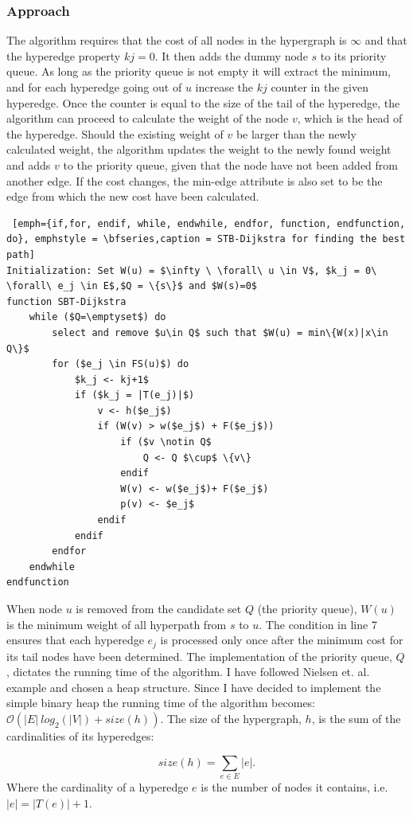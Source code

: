 \documentclass[a4paper,10pt,titlepage]{paper}
\begin{document}
\subsubsection{Approach}
The algorithm requires that the cost of all nodes in the hypergraph is $\infty$ and that the hyperedge property $kj=0$. It then adds the dummy node $s$ to its priority queue. As long as the priority queue is not empty it will extract the minimum, and for each hyperedge going out of $u$ increase the $kj$ counter in the given hyperedge. Once the counter is equal to the size of the tail of the hyperedge, the algorithm can proceed to calculate the weight of the node $v$, which is the head of the hyperedge. Should the existing weight of $v$ be larger than the newly calculated weight, the algorithm updates the weight to the newly found weight and adds $v$ to the priority queue, given that the node have not been added from another edge. If the cost changes, the min-edge attribute is also set to be the edge from which the new cost have been calculated.
\begin{lstlisting} [emph={if,for, endif, while, endwhile, endfor, function, endfunction, do}, emphstyle = \bfseries,caption = STB-Dijkstra for finding the best path]
Initialization: Set W(u) = $\infty \ \forall\ u \in V$, $k_j = 0\ \forall\ e_j \in E$,$Q = \{s\}$ and $W(s)=0$
function SBT-Dijkstra
	while ($Q=\emptyset$) do
		select and remove $u\in Q$ such that $W(u) = min\{W(x)|x\in Q\}$
		for ($e_j \in FS(u)$) do
			$k_j <- kj+1$
			if ($k_j = |T(e_j)|$) 
				v <- h($e_j$)
				if (W(v) > w($e_j$) + F($e_j$))
					if ($v \notin Q$  
						Q <- Q $\cup$ \{v\}
					endif
					W(v) <- w($e_j$)+ F($e_j$)
					p(v) <- $e_j$
				endif
			endif
		endfor
	endwhile
endfunction
\end{lstlisting}
When node $u$ is removed from the candidate set $Q$ (the priority queue), $W(u)$ is the minimum weight of all hyperpath from $s$ to $u$. The condition in line 7 ensures that each hyperedge $e_j$ is processed only once after the minimum cost for its tail nodes have been determined. The implementation of the priority queue, $Q$, dictates the running time of the algorithm. I have followed Nielsen et. al. example and chosen a heap structure. Since I have decided to implement the simple binary heap the running time of the algorithm becomes: $\mathcal{O}(|E|\ log_2(|V|) + size(h))$. The size of the hypergraph, $h$, is the sum of the cardinalities of its hyperedges:

\begin{equation}
size(h) = \displaystyle\sum_{e\in E} |e|.
\end{equation}
Where the cardinality of a hyperedge $e$ is the number of nodes it contains, i.e. $|e| = |T(e)| + 1$.\cite{Nielsen}
\end{document}
